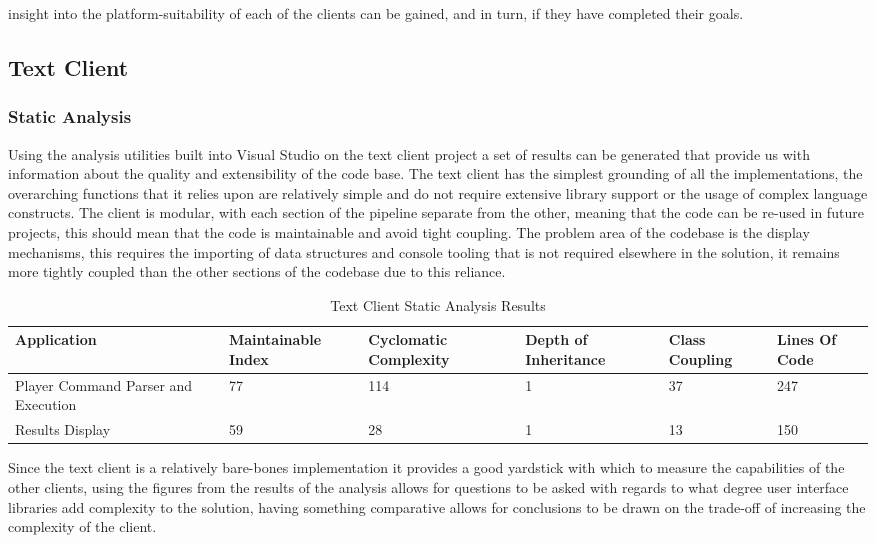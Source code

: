 \documentclass{article}
\begin{document}
insight into the platform-suitability of each of the clients can be gained, and in turn, if they have completed their goals.
\subsection{Text Client}
\subsubsection{Static Analysis}
Using the analysis utilities built into Visual Studio on the text client project a set of results can be generated that provide us with information about the quality and extensibility of the code base. The text client has the simplest grounding of all the implementations, the overarching functions that it relies upon are relatively simple and do not require extensive library support or the usage of complex language constructs. The client is modular, with each section of the pipeline separate from the other, meaning that the code can be re-used in future projects, this should mean that the code is maintainable and avoid tight coupling. The problem area of the codebase is the display mechanisms, this requires the importing of data structures and console tooling that is not required elsewhere in the solution, it remains more tightly coupled than the other sections of the codebase due to this reliance.
\begin{table}[H]
	\centering
	\caption{Text Client Static Analysis Results}
	\label{my-label}
	\begin{tabularx}{\textwidth}{|X|X|X|X|X|X|}
		\hline
		\textbf{Application} & \textbf{Maintainable Index} & \textbf{Cyclomatic Complexity} & \textbf{Depth of Inheritance} & \textbf{Class Coupling} & \textbf{Lines Of Code} \\ \hline
		Player Command Parser and Execution & 77 &      114     &     1      &    37       &     247      \\ \hline
		Results Display & 59 &       28    &       1    &     13      &       150    \\ \hline
	\end{tabularx}
\end{table}
Since the text client is a relatively bare-bones implementation it provides a good yardstick with which to measure the capabilities of the other clients, using the figures from the results of the analysis allows for questions to be asked with regards to what degree user interface libraries add complexity to the solution, having something comparative allows for conclusions to be drawn on the trade-off of increasing the complexity of the client.
\end{document}
